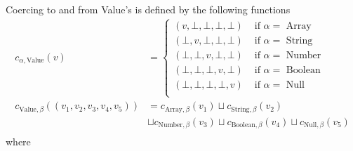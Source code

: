 Coercing to and from Value's is defined by the following functions
\begin{align*}
c_{\alpha,\text{Value}}(v) &=   \begin{cases} 
       (v, \bot, \bot, \bot, \bot) & \text{ if $\alpha = $ Array} \\
       (\bot, v, \bot, \bot, \bot) & \text{ if $\alpha = $ String} \\
       ( \bot, \bot, v, \bot, \bot) & \text{ if $\alpha = $ Number} \\
       (\bot, \bot, \bot,v,  \bot) & \text{ if $\alpha = $ Boolean} \\
       (\bot, \bot, \bot, \bot, v) & \text{ if $\alpha = $ Null} \\
  \end{cases}\\
  c_{\text{Value}, \beta}((v_1, v_2, v_3, v_4, v_5)) &= 
  c_{\text{Array}, \beta}(v_1) \sqcup c_{\text{String}, \beta}(v_2) \\ 
  &\sqcup c_{\text{Number}, \beta}(v_3) \sqcup c_{\text{Boolean},\beta}(v_4) \sqcup c_{\text{Null}, \beta}(v_5)\\
\end{align*}
where 
